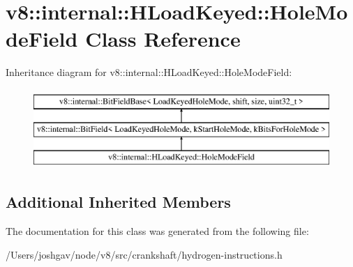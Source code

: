 \hypertarget{classv8_1_1internal_1_1_h_load_keyed_1_1_hole_mode_field}{}\section{v8\+:\+:internal\+:\+:H\+Load\+Keyed\+:\+:Hole\+Mode\+Field Class Reference}
\label{classv8_1_1internal_1_1_h_load_keyed_1_1_hole_mode_field}
Inheritance diagram for v8\+:\+:internal\+:\+:H\+Load\+Keyed\+:\+:Hole\+Mode\+Field\+:\begin{figure}[H]
\begin{center}
\leavevmode
\includegraphics[height=3.000000cm]{classv8_1_1internal_1_1_h_load_keyed_1_1_hole_mode_field}
\end{center}
\end{figure}
\subsection*{Additional Inherited Members}


The documentation for this class was generated from the following file\+:\begin{DoxyCompactItemize}
\item 
/\+Users/joshgav/node/v8/src/crankshaft/hydrogen-\/instructions.\+h\end{DoxyCompactItemize}
